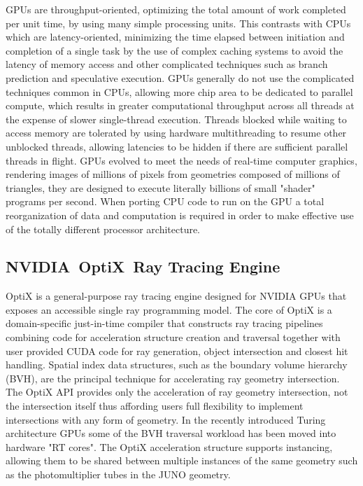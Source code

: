\documentclass{webofc}
\begin{document}
GPUs are throughput-oriented\cite{throughput}, optimizing the total amount of work completed per unit time,
by using many simple processing units. This contrasts with CPUs which are latency-oriented, 
minimizing the time elapsed between initiation and completion of a single task by the use of complex
caching systems to avoid the latency of memory access and other complicated techniques such as branch prediction 
and speculative execution. GPUs generally do not use the complicated techniques common in CPUs, 
allowing more chip area to be dedicated to parallel compute, which results in greater computational throughput across 
all threads at the expense of slower single-thread execution.
Threads blocked while waiting to access memory are tolerated by using 
hardware multithreading to resume other unblocked threads, allowing latencies to be hidden if
there are sufficient parallel threads in flight. 
GPUs evolved to meet the needs of real-time computer graphics, rendering images of millions of pixels from geometries
composed of millions of triangles, they are designed to execute literally billions of small "shader" 
programs per second. When porting CPU code to run on the GPU a total reorganization of 
data and computation is required in order to make effective use of the totally different processor 
architecture.
%
\subsection{NVIDIA\textregistered\ OptiX\texttrademark\ Ray Tracing Engine}
%
OptiX\cite{optixPaper}\cite{optixSite}\cite{optixDocs} is a general-purpose ray tracing engine
designed for NVIDIA GPUs that exposes an accessible single ray programming model.
The core of OptiX is a domain-specific just-in-time compiler that constructs 
ray tracing pipelines combining code for acceleration structure creation and traversal 
together with user provided CUDA code for ray generation, object intersection and closest hit handling.
Spatial index data structures, such as the boundary volume hierarchy (BVH), are the 
principal technique for accelerating ray geometry intersection.  The OptiX API\cite{optixDocs} 
provides only the acceleration of ray geometry intersection, not the intersection itself 
thus affording users full flexibility to implement intersections with any form of geometry. In the recently introduced Turing 
architecture GPUs some of the BVH traversal workload has been moved into hardware "RT cores"\cite{rtx}.
The OptiX acceleration structure supports instancing, allowing them to be shared 
between multiple instances of the same geometry such as the photomultiplier tubes in the JUNO geometry.  
%
\end{document}

